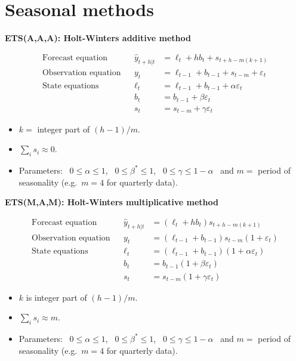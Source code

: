 \documentclass[
  14pt,
  ignorenonframetext,
  aspectratio=169,
]{beamer}
\providecommand{\tightlist}{%
  \setlength{\itemsep}{0pt}\setlength{\parskip}{0pt}}
\begin{document}
\section{Seasonal methods}\label{seasonal-methods}

\begin{frame}{\fontsize{16}{16}\sf\bfseries ETS(A,A,A): Holt-Winters additive method}
\protect{}\label{section}
\begin{block}{}\vspace*{-0.7cm}
\begin{align*}
\text{Forecast equation} && \hat{y}_{t+h|t} &= \ell_{t} + hb_{t} + s_{t+h-m(k+1)}\\
\text{Observation equation}&& y_t&=\ell_{t-1}+b_{t-1}+s_{t-m} + \varepsilon_t\\
\text{State equations}&& \ell_t&=\ell_{t-1}+b_{t-1}+\alpha \varepsilon_t\\
&&        b_t&=b_{t-1}+\beta \varepsilon_t \\
&&s_t &= s_{t-m} + \gamma\varepsilon_t
\end{align*}
\end{block}

\begin{itemize}
\tightlist
\item
  \(k=\) integer part of \((h-1)/m\).
\item
  \(\sum_i s_i \approx 0\).
\item
  Parameters:~ \(0\le \alpha\le 1\),~ \(0\le \beta^*\le 1\),~
  \(0\le \gamma\le 1-\alpha\)~ and \(m=\) period of seasonality
  (e.g.~\(m=4\) for quarterly data).
\end{itemize}
\end{frame}

\begin{frame}{\fontsize{16}{16}\sf\bfseries ETS(M,A,M): Holt-Winters multiplicative method}
\protect{}\label{section-1}
\begin{block}{}\vspace*{-0.7cm}
\begin{align*}
\text{Forecast equation} && \hat{y}_{t+h|t} &= (\ell_{t} + hb_{t}) s_{t+h-m(k+1)}\\
\text{Observation equation}&& y_t&= (\ell_{t-1}+b_{t-1})s_{t-m}(1 + \varepsilon_t)\\
\text{State equations}&& \ell_t&=(\ell_{t-1}+b_{t-1})(1+\alpha \varepsilon_t)\\
&&        b_t&=b_{t-1}(1+\beta \varepsilon_t) \\
&&s_t &= s_{t-m}(1 + \gamma\varepsilon_t)
\end{align*}
\end{block}

\begin{itemize}
\tightlist
\item
  \(k\) is integer part of \((h-1)/m\).
\item
  \(\sum_i s_i \approx m\).
\item
  Parameters:~ \(0\le \alpha\le 1\),~ \(0\le \beta^*\le 1\),~
  \(0\le \gamma\le 1-\alpha\)~ and \(m=\) period of seasonality
  (e.g.~\(m=4\) for quarterly data).
\end{itemize}
\end{frame}
\end{document}
